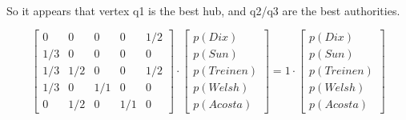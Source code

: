 \documentclass[12pt]{article}
\begin{document}
\

So it appears that vertex q1 is the best hub, and q2/q3 are the best authorities.

\begin{displaymath}
\begin{bmatrix}
    0 & 0 & 0 & 0 & 1 / 2 \\
    1 / 3 & 0 & 0 & 0 & 0 \\
    1 / 3 & 1 / 2 & 0 & 0 & 1 / 2 \\
    1 / 3 & 0 & 1 / 1 & 0 & 0 \\
	0 & 1 / 2 & 0 & 1 / 1 & 0
  \end{bmatrix}
  \cdot
  \begin{bmatrix}
     p(Dix)\\
     p(Sun)\\
     p(Treinen)\\
     p(Welsh)\\
     p(Acosta)
  \end{bmatrix}
  =
  1 \cdot
  \begin{bmatrix}
     p(Dix)\\
     p(Sun)\\
     p(Treinen)\\
     p(Welsh)\\
     p(Acosta)
  \end{bmatrix}
\end{displaymath}
\end{document}
